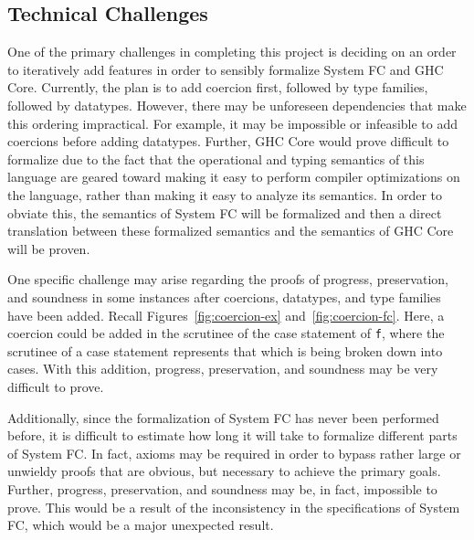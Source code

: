 \documentclass{sig-alternate}
\begin{document}
\subsection{Technical Challenges}
\label{subsec:tech_challenges}
One of the primary challenges in completing this project is deciding on an order to iteratively add features in order to sensibly formalize System FC and GHC Core. Currently, the plan is to add coercion first, followed by type families, followed by datatypes. However, there may be unforeseen dependencies that make this ordering impractical. For example, it may be impossible or infeasible to add coercions before adding datatypes. Further, GHC Core would prove difficult to formalize due to the fact that the operational and typing semantics of this language are geared toward making it easy to perform compiler optimizations on the language, rather than making it easy to analyze its semantics. In order to obviate this, the semantics of System FC will be formalized and then a direct translation between these formalized semantics and the semantics of GHC Core will be proven.

One specific challenge may arise regarding the proofs of progress, preservation, and soundness in some instances after coercions, datatypes, and type families have been added. Recall Figures~\ref{fig:coercion-ex} and~\ref{fig:coercion-fc}. Here, a coercion could be added in the scrutinee of the case statement of \texttt{f}, where the scrutinee of a case statement represents that which is being broken down into cases. With this addition, progress, preservation, and soundness may be very difficult to prove.

Additionally, since the formalization of System FC has never been performed before, it is difficult to estimate how long it will take to formalize different parts of System FC. In fact, axioms may be required in order to bypass rather large or unwieldy proofs that are obvious, but necessary to achieve the primary goals. Further, progress, preservation, and soundness may be, in fact, impossible to prove. This would be a result of the inconsistency in the specifications of System FC, which would be a major unexpected result.
\end{document}
